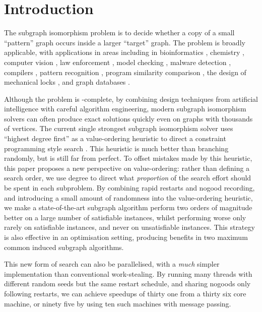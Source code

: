 \documentclass[runningheads]{llncs}
\begin{document}
\section{Introduction}

The subgraph isomorphism problem is to decide whether a copy of a small ``pattern'' graph occurs
inside a larger ``target'' graph. The problem is broadly applicable, with applications in areas
including in bioinformatics \cite{DBLP:journals/bmcbi/BonniciGPSF13}, chemistry \cite{o:Regin95}, computer vision
\cite{DBLP:journals/cviu/DamiandSHJS11,DBLP:journals/pr/SolnonDHJ15}, law enforcement
\cite{DBLP:journals/cacm/CoffmanGM04}, model checking \cite{DBLP:journals/tcs/SevegnaniC15},
malware detection \cite{DBLP:conf/dimva/BruschiMM06}, compilers
\cite{DBLP:conf/cgo/MurrayF12,DBLP:conf/cp/BlindellLCS15}, pattern recognition
\cite{DBLP:journals/ijprai/FoggiaPV14}, program similarity
comparison \cite{o:DallaPredaV17}, the design of mechanical locks
\cite{DBLP:journals/siamrev/VomelLBF17}, and graph databases
\cite{DBLP:journals/jair/McCreeshPST18}.

Although the problem is \NP-complete, by combining design techniques from artificial intelligence
with careful algorithm engineering, modern subgraph isomorphism solvers can often produce exact
solutions quickly even on graphs with thousands of vertices. The current single strongest subgraph
isomorphism solver uses ``highest degree first'' as a value-ordering heuristic to direct a
constraint programming style search
\cite{DBLP:conf/cp/McCreeshP15,DBLP:conf/lion/KotthoffMS16,DBLP:journals/jair/McCreeshPST18}. This
heuristic is much better than branching randomly, but is still far from perfect. To offset mistakes
made by this heuristic, this paper proposes a new perspective on value-ordering: rather than
defining a search order, we use degree to direct what \emph{proportion} of the search effort should
be spent in each subproblem. By combining rapid restarts and nogood recording, and introducing a
small amount of randomness into the value-ordering heuristic, we make a state-of-the-art subgraph
algorithm perform two orders of magnitude better on a large number of satisfiable instances, whilst
performing worse only rarely on satisfiable instances, and never on unsatisfiable instances.  This
strategy is also effective in an optimisation setting, producing benefits in two maximum common
induced subgraph algorithms.

This new form of search can also be parallelised, with a \emph{much} simpler implementation than
conventional work-stealing. By running many threads with different random seeds but the same restart
schedule, and sharing nogoods only following restarts, we can achieve speedups of thirty one from a
thirty six core machine, or ninety five by using ten such machines with message passing.
\end{document}
